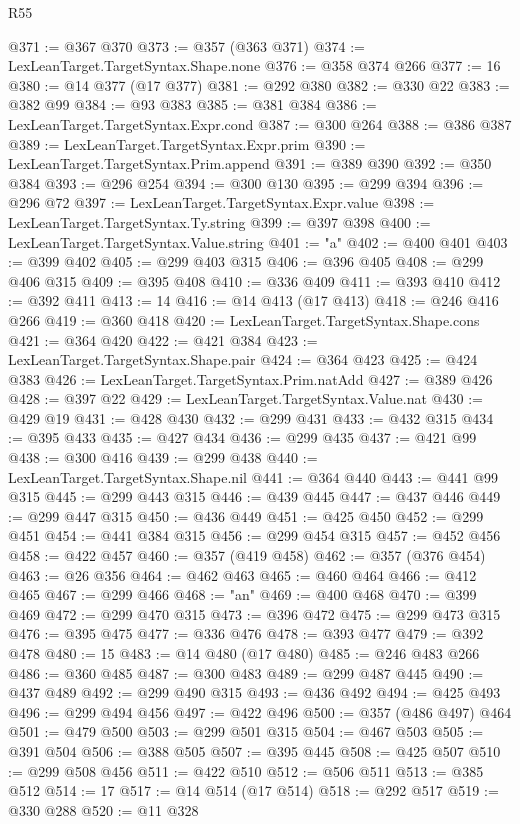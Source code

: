 \begin{lexlean}{R55}
\begin{coremodule}
@371 := @367 @370
@373 := @357 (@363 @371)
@374 := LexLeanTarget.TargetSyntax.Shape.none
@376 := @358 @374 @266
@377 := 16
@380 := @14 @377 (@17 @377)
@381 := @292 @380
@382 := @330 @22
@383 := @382 @99
@384 := @93 @383
@385 := @381 @384
@386 := LexLeanTarget.TargetSyntax.Expr.cond
@387 := @300 @264
@388 := @386 @387
@389 := LexLeanTarget.TargetSyntax.Expr.prim
@390 := LexLeanTarget.TargetSyntax.Prim.append
@391 := @389 @390
@392 := @350 @384
@393 := @296 @254
@394 := @300 @130
@395 := @299 @394
@396 := @296 @72
@397 := LexLeanTarget.TargetSyntax.Expr.value
@398 := LexLeanTarget.TargetSyntax.Ty.string
@399 := @397 @398
@400 := LexLeanTarget.TargetSyntax.Value.string
@401 := "a"
@402 := @400 @401
@403 := @399 @402
@405 := @299 @403 @315
@406 := @396 @405
@408 := @299 @406 @315
@409 := @395 @408
@410 := @336 @409
@411 := @393 @410
@412 := @392 @411
@413 := 14
@416 := @14 @413 (@17 @413)
@418 := @246 @416 @266
@419 := @360 @418
@420 := LexLeanTarget.TargetSyntax.Shape.cons
@421 := @364 @420
@422 := @421 @384
@423 := LexLeanTarget.TargetSyntax.Shape.pair
@424 := @364 @423
@425 := @424 @383
@426 := LexLeanTarget.TargetSyntax.Prim.natAdd
@427 := @389 @426
@428 := @397 @22
@429 := LexLeanTarget.TargetSyntax.Value.nat
@430 := @429 @19
@431 := @428 @430
@432 := @299 @431
@433 := @432 @315
@434 := @395 @433
@435 := @427 @434
@436 := @299 @435
@437 := @421 @99
@438 := @300 @416
@439 := @299 @438
@440 := LexLeanTarget.TargetSyntax.Shape.nil
@441 := @364 @440
@443 := @441 @99 @315
@445 := @299 @443 @315
@446 := @439 @445
@447 := @437 @446
@449 := @299 @447 @315
@450 := @436 @449
@451 := @425 @450
@452 := @299 @451
@454 := @441 @384 @315
@456 := @299 @454 @315
@457 := @452 @456
@458 := @422 @457
@460 := @357 (@419 @458)
@462 := @357 (@376 @454)
@463 := @26 @356
@464 := @462 @463
@465 := @460 @464
@466 := @412 @465
@467 := @299 @466
@468 := "an"
@469 := @400 @468
@470 := @399 @469
@472 := @299 @470 @315
@473 := @396 @472
@475 := @299 @473 @315
@476 := @395 @475
@477 := @336 @476
@478 := @393 @477
@479 := @392 @478
@480 := 15
@483 := @14 @480 (@17 @480)
@485 := @246 @483 @266
@486 := @360 @485
@487 := @300 @483
@489 := @299 @487 @445
@490 := @437 @489
@492 := @299 @490 @315
@493 := @436 @492
@494 := @425 @493
@496 := @299 @494 @456
@497 := @422 @496
@500 := @357 (@486 @497) @464
@501 := @479 @500
@503 := @299 @501 @315
@504 := @467 @503
@505 := @391 @504
@506 := @388 @505
@507 := @395 @445
@508 := @425 @507
@510 := @299 @508 @456
@511 := @422 @510
@512 := @506 @511
@513 := @385 @512
@514 := 17
@517 := @14 @514 (@17 @514)
@518 := @292 @517
@519 := @330 @288
@520 := @11 @328

\end{coremodule}
\end{lexlean}
